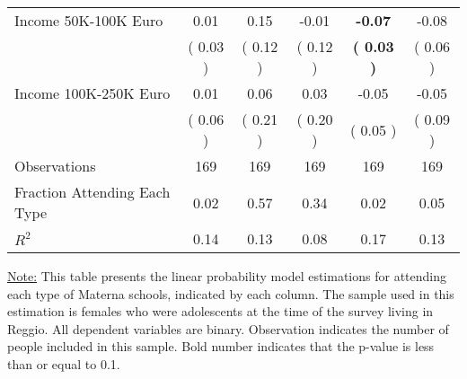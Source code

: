 \begin{table}[H]
{\begin{tabular}{lccccc}
\quad Income 50K-100K Euro &      0.01 &      0.15 &     -0.01 & \textbf{    -0.07} &     -0.08 \\
\quad  & (     0.03 ) & (     0.12 )  & (     0.12 )  & \textbf{(     0.03 )} & (     0.06 ) \\
\quad Income 100K-250K Euro &      0.01 &      0.06 &      0.03 &     -0.05 &     -0.05 \\
\quad  & (     0.06 ) & (     0.21 )  & (     0.20 )  & (     0.05 ) & (     0.09 ) \\
\midrule
Observations & 169 & 169 & 169 & 169 & 169 \\
Fraction Attending Each Type &      0.02 &      0.57 &      0.34 &      0.02 &      0.05 \\
\midrule
$ R^2$ &      0.14 &      0.13 &      0.08 &      0.17 &      0.13 \\
\bottomrule
\end{tabular}}
\end{table}
\begin{footnotesize}
\noindent\underline{Note:} This table presents the linear probability model estimations for attending each type of Materna schools, indicated by each column. The sample used in this estimation is females who were adolescents at the time of the survey living in Reggio. All dependent variables are binary. Observation indicates the number of people included in this sample. Bold number indicates that the p-value is less than or equal to 0.1.
\end{footnotesize}
